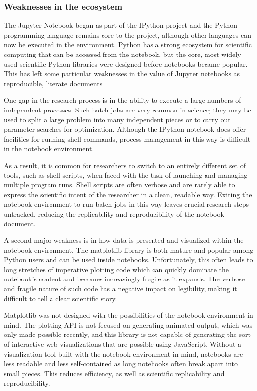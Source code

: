\documentclass[phd,ianc,twoside]{infthesis}
\begin{document}
\subsubsection*{Weaknesses in the ecosystem}

The Jupyter Notebook began as part of the IPython project and the Python
programming language remains core to the project, although other
languages can now be executed in the environment. Python has a strong
ecosystem for scientific computing that can be accessed from the
notebook, but the core, most widely used scientific Python libraries were
designed before notebooks became popular. This has left some particular
weaknesses in the value of Jupyter notebooks as reproducible, literate
documents.

One gap in the research process is in the ability to execute a large
numbers of independent processes. Such batch jobs are very common in
science; they may be used to split a large problem into many independent
pieces or to carry out parameter searches for optimization. Although the
IPython notebook does offer facilities for running shell commands,
process management in this way is difficult in the notebook environment.

As a result, it is common for researchers to switch to an entirely
different set of tools, such as shell scripts, when faced with the task
of launching and managing multiple program runs. Shell scripts are often
verbose and are rarely able to express the scientific intent of the
researcher in a clean, readable way. Exiting the notebook environment to
run batch jobs in this way leaves crucial research steps untracked,
reducing the replicability and reproducibility of the notebook document.

A second major weakness is in how data is presented and visualized
within the notebook environment. The matplotlib library
\citep{hunter_ieee07} is both mature and popular among Python users and
can be used inside notebooks. Unfortunately, this often leads to long
stretches of imperative plotting code which can quickly dominate the
notebook's content and becomes increasingly fragile as it expands. The
verbose and fragile nature of such code has a negative impact on
legibility, making it difficult to tell a clear scientific story.

Matplotlib was not designed with the possibilities of the notebook
environment in mind. The plotting API is not focused on generating
animated output, which was only made possible recently, and this library
is not capable of generating the sort of interactive web visualizations
that are possible using JavaScript. Without a visualization tool built
with the notebook environment in mind, notebooks are less readable and
less self-contained as long notebooks often break apart into small
pieces. This reduces efficiency, as well as scientific replicability and
reproducibility.
\end{document}

